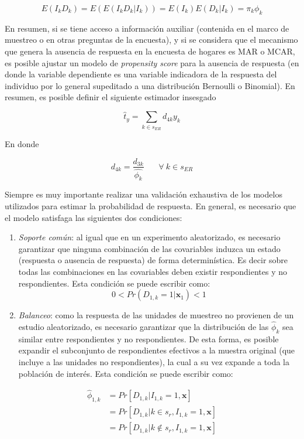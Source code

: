 \documentclass[
  12pt,
]{book}
\providecommand{\tightlist}{%
  \setlength{\itemsep}{0pt}\setlength{\parskip}{0pt}}
\begin{document}
\[
E(I_kD_k) 
= E\left(E(I_kD_k|I_k) \right)
= E(I_k)E(D_k|I_k) = \pi_k \phi_k
\]

En resumen, si se tiene acceso a información auxiliar (contenida en el marco de muestreo o en otras preguntas de la encuesta), y si se considera que el mecanismo que genera la ausencia de respuesta en la encuesta de hogares es MAR o MCAR, es posible ajustar un modelo de \emph{propensity score} para la ausencia de respuesta (en donde la variable dependiente es una variable indicadora de la respuesta del individuo por lo general supeditado a una distribución Bernoulli o Binomial). En resumen, es posible definir el siguiente estimador insesgado

\[
\hat{t}_y=\sum_{k\in s_{ER}}d_{4k}y_k
\]

En donde

\[
d_{4k} = \frac{d_{3k}}{\hat{\phi_k}}  \ \ \ \ \ \ \ \ \forall \ k  \in s_{ER}
\]

Siempre es muy importante realizar una validación exhaustiva de los modelos utilizados para estimar la probabilidad de respuesta. En general, es necesario que el modelo satisfaga las siguientes dos condiciones:

\begin{enumerate}
\def\labelenumi{\arabic{enumi}.}
\tightlist
\item
  \emph{Soporte común}: al igual que en un experimento aleatorizado, es necesario garantizar que ninguna combinación de las covariables induzca un estado (respuesta o ausencia de respuesta) de forma determinística. Es decir sobre todas las combinaciones en las covariables deben existir respondientes y no respondientes. Esta condición se puede escribir como:
  \[
  0 < Pr(D_{1,k} = 1 |\mathbf{x}_{1}) < 1 
  \]
\item
  \emph{Balanceo}: como la respuesta de las unidades de muestreo no provienen de un estudio aleatorizado, es necesario garantizar que la distribución de las \(\hat\phi_k\) sea similar entre respondientes y no respondientes. De esta forma, es posible expandir el subconjunto de respondientes efectivos a la muestra original (que incluye a las unidades no respondientes), la cual a su vez expande a toda la población de interés. Esta condición se puede escribir como:
\end{enumerate}

\begin{align*}
\hat\phi_{1, k} &= Pr[D_{1, k} | I_{1, k} = 1,\mathbf{x}] \\
&= Pr[D_{1, k} | k \in s_r, I_{1, k} = 1, \mathbf{x}] \\
&= Pr[D_{1, k} | k \notin s_r, I_{1, k} = 1, \mathbf{x}]
\end{align*}
\end{document}
